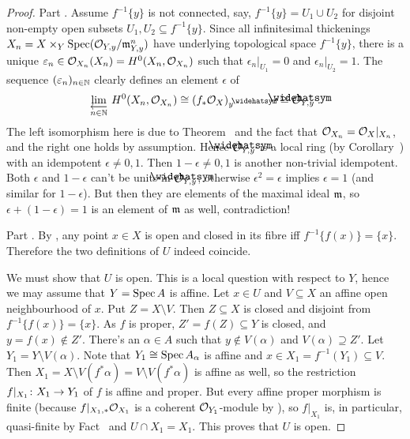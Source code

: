 \documentclass[a4paper,parskip=half,numbers=enddot, DIV=12]{scrreprt}
\begin{document}
\begin{proof}
	Part . Assume $f^{-1}\{y\}$ is not connected, say, $f^{-1}\{y\}=U_1\cup U_2$ for disjoint non-empty open subsets $U_1,U_2\subseteq f^{-1}\{y\}$. Since all infinitesimal thickenings $X_n=X\times_Y\operatorname{Spec}(\mathcal{O}_{Y,y}/\mathfrak{m}_{Y,y}^n)$ have underlying topological space $f^{-1}\{y\}$, there is a unique $\varepsilon_n\in\mathcal{O}_{X_n}(X_n)=H^0(X_n,\mathcal{O}_{X_n})$ such that $\epsilon_n|_{U_1}=0$ and $\epsilon_n|_{U_2}=1$. The sequence $(\varepsilon_n)_{n\in\mathbb{N}}$ clearly defines an element $\epsilon$ of
	\begin{align*}
		\limit[n\in\IN]H^0(X_n,\Oo_{X_n})\cong (f_*\Oo_X)_y^\complete\cong \roof{\Oo}_{Y,y}\;.
	\end{align*}
	The left isomorphism here is due to Theorem~ and the fact that $\mathcal{O}_{X_n}=\mathcal{O}_X|_{X_n}$, and the right one holds by assumption. Hence $\roof{\Oo}_{Y,y}$ is a local ring (by Corollary~) with an idempotent $\epsilon\neq 0,1$. Then $1-\epsilon\neq 0,1$ is another non-trivial idempotent. Both $\epsilon$ and $1-\epsilon$ can't be units in $\roof{\Oo}_{Y,y}$, otherwise $\epsilon^2=\epsilon$ implies $\epsilon=1$ (and similar for $1-\epsilon$). But then they are elements of the maximal ideal $\mathfrak{m}$, so $\epsilon+(1-\epsilon)=1$ is an element of $\mathfrak{m}$ as well, contradiction!
	
	Part . By , any point $x\in X$ is open and closed in its fibre iff $f^{-1}\{f(x)\}=\{x\}$. Therefore the two definitions of $U$ indeed coincide. 
	
	We must show that $U$ is open. This is a local question with respect to $Y$, hence we may assume that $Y=\operatorname{Spec} A$ is affine. Let $x\in U$ and $V\subseteq X$ an affine open neighbourhood of $x$. Put $Z=X\setminus V$. Then $Z\subseteq X$ is closed and disjoint from $f^{-1}\{f(x)\}=\{x\}$. As $f$ is proper, $Z'=f(Z)\subseteq Y$ is closed, and $y=f(x)\notin Z'$. There's an $\alpha\in A$ such that $y\notin V(\alpha)$ and $V(\alpha)\supseteq Z'$. Let $Y_1=Y\setminus V(\alpha)$. Note that $Y_1\cong \operatorname{Spec} A_\alpha$ is affine and $x\in X_1=f^{-1}(Y_1)\subseteq V$. Then $X_1=X\setminus V(f^*\alpha)=V\setminus V(f^*\alpha)$ is affine as well, so the restriction $f|_{X_1}\colon X_1\morphism Y_1$ of $f$ is affine and proper. But every affine proper morphism is finite (because $f|_{X_1,*}\mathcal{O}_{X_1}$ is a coherent $\mathcal{O}_{Y_1}$-module by \cite[Theorem~5]{alggeo2}), so $f|_{X_1}$ is, in particular, quasi-finite by Fact~ and $U\cap X_1=X_1$. This proves that $U$ is open.
\end{proof}
\end{document}
